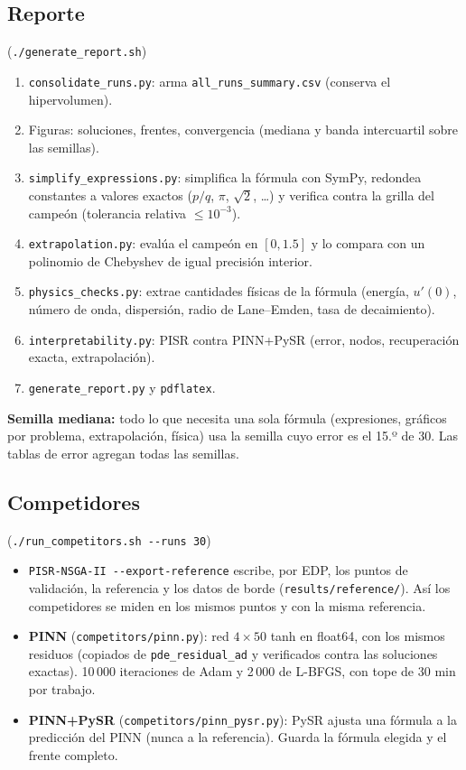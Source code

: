 \documentclass[11pt,a4paper]{article}
\newcommand{\code}[1]{\texttt{\small #1}}
\newcommand{\nota}[1]{\par\smallskip\noindent\colorbox{boxbg}{\parbox{\dimexpr\linewidth-2\fboxsep}{\small #1}}\par\smallskip}
\begin{document}
\subsection{Reporte} (\code{./generate\_report.sh})
\begin{enumerate}
\item \code{consolidate\_runs.py}: arma \code{all\_runs\_summary.csv} (conserva el hipervolumen).
\item Figuras: soluciones, frentes, convergencia (mediana y banda intercuartil sobre las semillas).
\item \code{simplify\_expressions.py}: simplifica la fórmula con SymPy, redondea constantes a valores
  exactos ($p/q$, $\pi$, $\sqrt2$, \dots) y verifica contra la grilla del campeón (tolerancia relativa
  $\le10^{-3}$).
\item \code{extrapolation.py}: evalúa el campeón en $[0,1.5]$ y lo compara con un polinomio de Chebyshev
  de igual precisión interior.
\item \code{physics\_checks.py}: extrae cantidades físicas de la fórmula (energía, $u'(0)$, número de
  onda, dispersión, radio de Lane--Emden, tasa de decaimiento).
\item \code{interpretability.py}: PISR contra PINN+PySR (error, nodos, recuperación exacta,
  extrapolación).
\item \code{generate\_report.py} y \code{pdflatex}.
\end{enumerate}
\nota{\textbf{Semilla mediana:} todo lo que necesita una sola fórmula (expresiones, gráficos por
problema, extrapolación, física) usa la semilla cuyo error es el 15.º de 30. Las tablas de error
agregan todas las semillas.}

\subsection{Competidores} (\code{./run\_competitors.sh -{}-runs 30})
\begin{itemize}
\item \code{PISR-NSGA-II -{}-export-reference} escribe, por EDP, los puntos de validación, la referencia y
  los datos de borde (\code{results/reference/}). Así los competidores se miden en los mismos puntos y
  con la misma referencia.
\item \textbf{PINN} (\code{competitors/pinn.py}): red $4\times50$ tanh en float64, con los mismos residuos
  (copiados de \code{pde\_residual\_ad} y verificados contra las soluciones exactas). 10\,000
  iteraciones de Adam y 2\,000 de L-BFGS, con tope de 30 min por trabajo.
\item \textbf{PINN+PySR} (\code{competitors/pinn\_pysr.py}): PySR ajusta una fórmula a la predicción del
  PINN (nunca a la referencia). Guarda la fórmula elegida y el frente completo.
\end{itemize}
\end{document}
